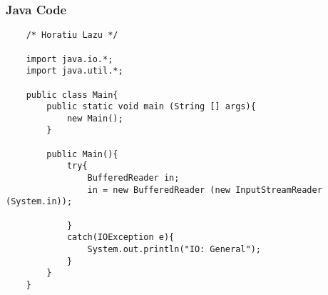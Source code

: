 \documentclass[52pt]{article}
\begin{document}
	\subsubsection {Java Code}
	\begin{lstlisting}
	/* Horatiu Lazu */

	import java.io.*;
	import java.util.*;

	public class Main{
		public static void main (String [] args){
			new Main();
		}
		
		public Main(){
			try{
				BufferedReader in;
				in = new BufferedReader (new InputStreamReader (System.in));
				
			}
			catch(IOException e){
				System.out.println("IO: General");
			}
		}
	}
	\end{lstlisting}

	\newpage
\end{document}
